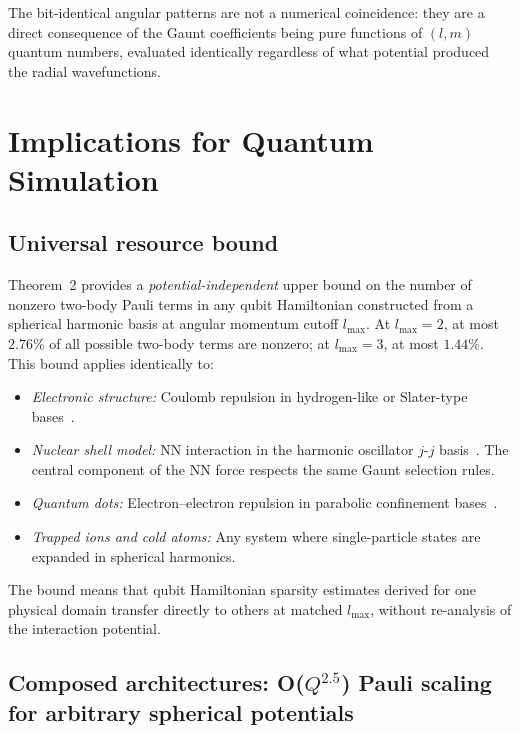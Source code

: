 \documentclass[twocolumn,pra,amsmath,amssymb,superscriptaddress]{revtex4-2}
\begin{document}
\noindent The bit-identical angular patterns are not a numerical
coincidence: they are a direct consequence of the Gaunt coefficients
being pure functions of $(l, m)$ quantum numbers, evaluated
identically regardless of what potential produced the radial
wavefunctions.

\section{Implications for Quantum Simulation}
\label{sec:implications}

\subsection{Universal resource bound}

Theorem~2 provides a \textit{potential-independent} upper bound on
the number of nonzero two-body Pauli terms in any qubit Hamiltonian
constructed from a spherical harmonic basis at angular momentum
cutoff $l_{\max}$.  At $l_{\max} = 2$, at most $2.76\%$ of all
possible two-body terms are nonzero; at $l_{\max}=3$, at most
$1.44\%$.  This bound applies identically to:

\begin{itemize}
\item \textit{Electronic structure:} Coulomb repulsion in
  hydrogen-like or Slater-type bases~\cite{GeoVac_Paper14}.
\item \textit{Nuclear shell model:} NN interaction in the harmonic
  oscillator $j$-$j$ basis~\cite{Suhonen2007}.  The central
  component of the NN force respects the same Gaunt selection
  rules.
\item \textit{Quantum dots:} Electron--electron repulsion in
  parabolic confinement bases~\cite{Reimann2002}.
\item \textit{Trapped ions and cold atoms:} Any system where
  single-particle states are expanded in spherical harmonics.
\end{itemize}

The bound means that qubit Hamiltonian sparsity estimates derived
for one physical domain transfer directly to others at matched
$l_{\max}$, without re-analysis of the interaction potential.

\subsection{Composed architectures: O($Q^{2.5}$) Pauli scaling for
arbitrary spherical potentials}
\end{document}
